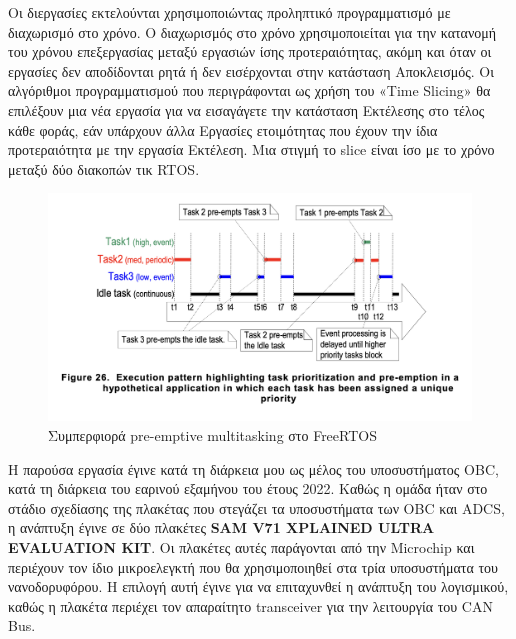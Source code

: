 \documentclass[a4paper,nobib,justified]{tufte-book}
\begin{document}
Οι διεργασίες εκτελούνται χρησιμοποιώντας προληπτικό προγραμματισμό με διαχωρισμό στο χρόνο. Ο διαχωρισμός στο χρόνο χρησιμοποιείται για την κατανομή του χρόνου επεξεργασίας μεταξύ εργασιών ίσης προτεραιότητας, ακόμη και όταν οι εργασίες δεν αποδίδονται ρητά ή δεν εισέρχονται στην κατάσταση Αποκλεισμός. Οι αλγόριθμοι προγραμματισμού που περιγράφονται ως χρήση του «Time Slicing» θα επιλέξουν μια νέα εργασία για να εισαγάγετε την κατάσταση Εκτέλεσης στο τέλος κάθε φοράς, εάν υπάρχουν άλλα Εργασίες ετοιμότητας που έχουν την ίδια προτεραιότητα με την εργασία Εκτέλεση. Μια στιγμή το slice είναι ίσο με το χρόνο μεταξύ δύο διακοπών τικ RTOS. %

\begin{figure}[h]
	\includegraphics{media/diagrams/freeRTOS-preemptive-multitasking.png}
	\caption{Συμπερφιορά pre-emptive multitasking στο FreeRTOS}
	\label{fig:freeRTOS-preemptive-multitasking}
\end{figure}

Η παρούσα εργασία έγινε κατά τη διάρκεια μου ως μέλος του υποσυστήματος OBC, κατά τη διάρκεια του εαρινού εξαμήνου του έτους 2022. Καθώς η ομάδα ήταν στο στάδιο σχεδίασης της πλακέτας που στεγάζει τα υποσυστήματα των OBC και ADCS, η ανάπτυξη έγινε σε δύο πλακέτες \textbf{SAM V71 XPLAINED ULTRA EVALUATION KIT}. Οι πλακέτες αυτές παράγονται από την Microchip και περιέχουν τον ίδιο μικροελεγκτή που θα χρησιμοποιηθεί στα τρία υποσυστήματα του νανοδορυφόρου. Η επιλογή αυτή έγινε για να επιταχυνθεί η ανάπτυξη του λογισμικού, καθώς η πλακέτα περιέχει τον απαραίτητο transceiver για την λειτουργία του CAN Bus. 
\end{document}
